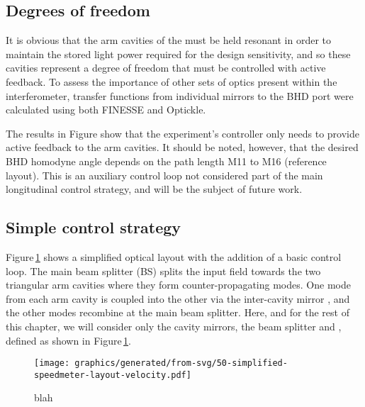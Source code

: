 \subsection{\label{sec:ssm-dofs}Degrees of freedom}
It is obvious that the arm cavities of the \SSM{} must be held resonant in order to maintain the  stored light power required for the design sensitivity, and so these cavities represent a degree of freedom that must be controlled with active feedback. To assess the importance of other sets of optics present within the interferometer, transfer functions from individual mirrors to the \gls{BHD} port were calculated using both FINESSE and Optickle.

The results in Figure  show that the experiment's controller only needs to provide active feedback to the arm cavities. It should be noted, however, that the desired \gls{BHD} homodyne angle depends on the path length M11 to M16 (reference layout). This is an auxiliary control loop not considered part of the main longitudinal control strategy, and will be the subject of future work.

\subsection{\label{sec:velocity-control}Simple control strategy}
Figure\,\ref{fig:simplified-speedmeter-layout-velocity} shows a simplified optical layout with the addition of a basic control loop. The main beam splitter (BS) splits the input field towards the two triangular arm cavities where they form counter-propagating modes. One mode from each arm cavity is coupled into the other via the inter-cavity mirror \MINT{}, and the other modes recombine at the main beam splitter. Here, and for the rest of this chapter, we will consider only the cavity mirrors, the beam splitter and \MINT{}, defined as shown in Figure\,\ref{fig:simplified-speedmeter-layout-velocity}.

\begin{figure}
  \centering
  \texttt{[image: graphics/generated/from-svg/50-simplified-speedmeter-layout-velocity.pdf]}
  \caption{\label{fig:simplified-speedmeter-layout-velocity}blah}
\end{figure}

